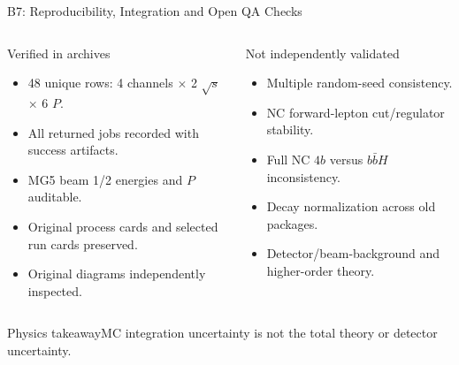 \documentclass[aspectratio=1610,english]{beamer}
\newcommand{\src}[1]{\vfill{\par\color{black!65}\fontsize{6.4}{7.4}\selectfont\emph{Source:} #1\par}}
\newcommand{\key}[1]{\begin{alertblock}{Physics takeaway}\scriptsize #1\end{alertblock}}
\begin{document}
\begin{frame}[t]{B7: Reproducibility, Integration and Open QA Checks}
\footnotesize

\begin{columns}%
\begin{exampleblock}{Verified in archives}
\begin{itemize}\item 48 unique rows: 4 channels $\times$ 2 $\sqrt{s}$ $\times$ 6 $P$.
\item All returned jobs recorded with success artifacts.
\item MG5 beam 1/2 energies and $P$ auditable.
\item Original process cards and selected run cards preserved.
\item Original diagrams independently inspected.
\end{itemize}\end{exampleblock}
\begin{alertblock}{Not independently validated}
\begin{itemize}\item Multiple random-seed consistency.
\item NC forward-lepton cut/regulator stability.
\item Full NC $4b$ versus $b\bar bH$ inconsistency.
\item Decay normalization across old packages.
\item Detector/beam-background and higher-order theory.
\end{itemize}\end{alertblock}
\end{columns}
\key{MC integration uncertainty is not the total theory or detector uncertainty.}

\end{frame}
\end{document}
